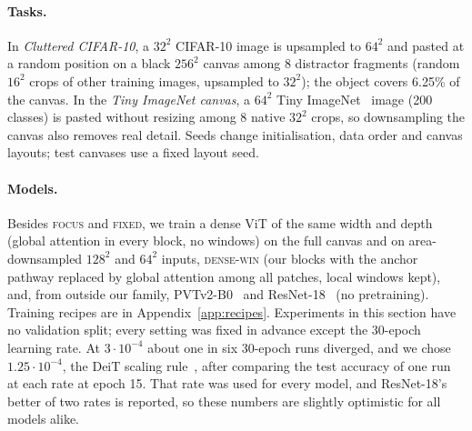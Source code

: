 \documentclass[runningheads]{llncs}
\newcommand{\focus}{\textsc{focus}}
\newcommand{\fixed}{\textsc{fixed}}
\newcommand{\densewin}{\textsc{dense-win}}
\begin{document}
\paragraph{Tasks.} In \emph{Cluttered CIFAR-10}, a $32^2$ CIFAR-10 image is upsampled to $64^2$
and pasted at a random position on a black $256^2$ canvas among 8 distractor fragments (random
$16^2$ crops of other training images, upsampled to $32^2$); the object covers 6.25\% of the
canvas. In the \emph{Tiny ImageNet canvas}, a $64^2$ Tiny ImageNet~\cite{le2015tinyimagenet}
image (200 classes) is pasted without resizing among 8 native $32^2$ crops, so downsampling the
canvas also removes real detail. Seeds change initialisation, data order and canvas layouts; test
canvases use a fixed layout seed.

\paragraph{Models.} Besides \focus{} and \fixed{}, we train a dense ViT of the same width and
depth (global attention in every block, no windows) on the full canvas and on area-downsampled
$128^2$ and $64^2$ inputs, \densewin{} (our blocks with the anchor pathway replaced by global
attention among all patches, local windows kept), and, from outside our family,
PVTv2-B0~\cite{wang2022pvtv2} and ResNet-18~\cite{he2016resnet} (no pretraining). Training
recipes are in Appendix~\ref{app:recipes}. Experiments in this section have no validation split;
every setting was fixed in advance except the 30-epoch learning rate. At $3\cdot10^{-4}$ about
one in six 30-epoch runs diverged, and we chose $1.25\cdot10^{-4}$, the DeiT scaling rule~\cite{touvron2021deit}, after comparing the test
accuracy of one run at each rate at epoch 15. That rate was used for every model, and ResNet-18's
better of two rates is reported, so these numbers are slightly optimistic for all models alike.
\end{document}
